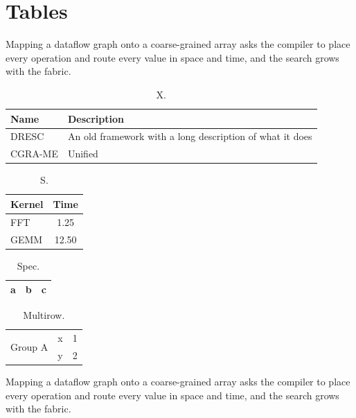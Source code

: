 \documentclass{article}
\begin{document}
\section{Tables}
Mapping a dataflow graph onto a coarse-grained array asks the compiler to place every operation and route every value in space and time, and the search grows with the fabric.

\begin{table}[h]\centering\begin{tabularx}{\linewidth}{lX}\toprule Name & Description\\\midrule DRESC & An old framework with a long description of what it does\\ CGRA-ME & Unified\\\bottomrule\end{tabularx}\caption{X.}\end{table}
\begin{table}[h]\centering\begin{tabular}{lS[table-format=2.2]}\toprule Kernel & {Time}\\\midrule FFT & 1.25\\ GEMM & 12.50\\\bottomrule\end{tabular}\caption{S.}\end{table}
\begin{table}[h]\centering\begin{tabular}{lcr}\toprule a & b & c\\\bottomrule\end{tabular}\caption{Spec.}\end{table}
\begin{table}[h]\centering\begin{tabular}{llr}\toprule \multirow{2}{*}{Group A} & x & 1\\ & y & 2\\\bottomrule\end{tabular}\caption{Multirow.}\end{table}
Mapping a dataflow graph onto a coarse-grained array asks the compiler to place every operation and route every value in space and time, and the search grows with the fabric.
\end{document}
